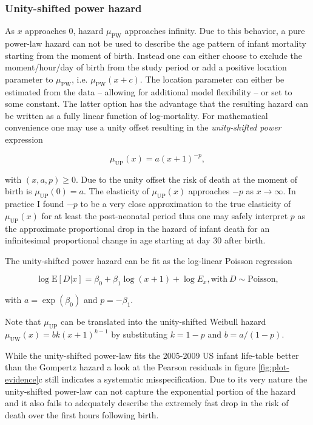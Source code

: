 \documentclass[smallextended]{svjour3} %
\begin{document}
\subsubsection*{Unity-shifted power
hazard}\label{unity-shifted-power-hazard}

As \(x\) approaches 0, hazard \(\mu_\text{PW}\) approaches infinity. Due
to this behavior, a pure power-law hazard can not be used to describe
the age pattern of infant mortality starting from the moment of birth.
Instead one can either choose to exclude the moment/hour/day of birth
from the study period \citep[as did][]{Choe1981, Berrut2016} or add a
positive location parameter to \(\mu_\text{PW}\), i.e.
\(\mu_\text{PW}(x+c)\). The location parameter can either be estimated
from the data -- allowing for additional model flexibility -- or set to
some constant. The latter option has the advantage that the resulting
hazard can be written as a fully linear function of log-mortality. For
mathematical convenience one may use a unity offset resulting in the
\emph{unity-shifted power} expression

\[
\mu_\text{UP}(x) = a(x+1)^{-p},
\]

with \((x, a, p)\geq 0\). Due to the unity offset the risk of death at
the moment of birth is \(\mu_\text{UP}(0)=a\). The elasticity of
\(\mu_\text{UP}(x)\) approaches \(-p\) as \(x\rightarrow \infty\). In
practice I found \(-p\) to be a very close approximation to the true
elasticity of \(\mu_\text{UP}(x)\) for at least the post-neonatal period
thus one may safely interpret \(p\) as the approximate proportional drop
in the hazard of infant death for an infinitesimal proportional change
in age starting at day 30 after birth.

The unity-shifted power hazard can be fit as the log-linear Poisson
regression

\[
\log\text{E}[D|x] =
\beta_0 + \beta_1\log (x+1) + \log E_x,
\text{with}~D\sim\text{Poisson},
\]

with \(a = \exp(\beta_0)\) and \(p = -\beta_1\).

Note that \(\mu_\text{UP}\) can be translated into the unity-shifted
Weibull hazard \(\mu_\text{UW}(x)=bk(x+1)^{k-1}\) by substituting
\(k=1-p\) and \(b=a/(1-p)\).

While the unity-shifted power-law fits the 2005-2009 US infant
life-table better than the Gompertz hazard a look at the Pearson
residuals in figure \ref{fig:plot-evidence}c still indicates a
systematic misspecification. Due to its very nature the unity-shifted
power-law can not capture the exponential portion of the hazard and it
also fails to adequately describe the extremely fast drop in the risk of
death over the first hours following birth.
\end{document}
